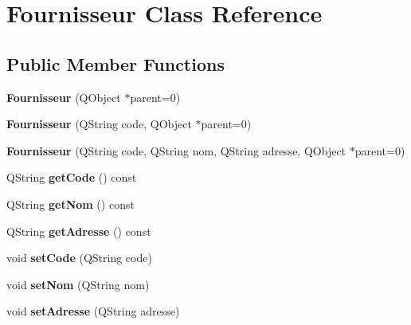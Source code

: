 \hypertarget{class_fournisseur}{
\section{Fournisseur Class Reference}
\label{class_fournisseur}
}
\subsection*{Public Member Functions}
\begin{DoxyCompactItemize}
\item 
\hypertarget{class_fournisseur_a38d96476a07abd831c7a74d494e7fe69}{
{\bfseries Fournisseur} (QObject $\ast$parent=0)}
\label{class_fournisseur_a38d96476a07abd831c7a74d494e7fe69}

\item 
\hypertarget{class_fournisseur_aaa914850a9c665a666f356dedab1b303}{
{\bfseries Fournisseur} (QString code, QObject $\ast$parent=0)}
\label{class_fournisseur_aaa914850a9c665a666f356dedab1b303}

\item 
\hypertarget{class_fournisseur_a0707ab51199fdb39a785722c00c3eb88}{
{\bfseries Fournisseur} (QString code, QString nom, QString adresse, QObject $\ast$parent=0)}
\label{class_fournisseur_a0707ab51199fdb39a785722c00c3eb88}

\item 
\hypertarget{class_fournisseur_a63310eeb312238add77390ceb4adf9b6}{
QString {\bfseries getCode} () const }
\label{class_fournisseur_a63310eeb312238add77390ceb4adf9b6}

\item 
\hypertarget{class_fournisseur_a25f1575ae5459478204547b6223ad1c9}{
QString {\bfseries getNom} () const }
\label{class_fournisseur_a25f1575ae5459478204547b6223ad1c9}

\item 
\hypertarget{class_fournisseur_a6727bd4b861dd60a7d3e62261f397da5}{
QString {\bfseries getAdresse} () const }
\label{class_fournisseur_a6727bd4b861dd60a7d3e62261f397da5}

\item 
\hypertarget{class_fournisseur_a661991ddd3d4b344bd65968d1168eee9}{
void {\bfseries setCode} (QString code)}
\label{class_fournisseur_a661991ddd3d4b344bd65968d1168eee9}

\item 
\hypertarget{class_fournisseur_a54e2fe8b31f1ae66ab5652e744cb5d59}{
void {\bfseries setNom} (QString nom)}
\label{class_fournisseur_a54e2fe8b31f1ae66ab5652e744cb5d59}

\item 
\hypertarget{class_fournisseur_a865981cbf61ea1371d05887dfbabde48}{
void {\bfseries setAdresse} (QString adresse)}
\label{class_fournisseur_a865981cbf61ea1371d05887dfbabde48}

\end{DoxyCompactItemize}

